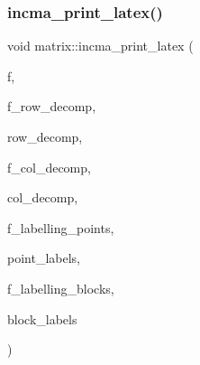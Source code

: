 \mbox{\label{classmatrix_a2f3ef897e502a22def6b90a7c02addf5}} 
\subsubsection{\texorpdfstring{incma\+\_\+print\+\_\+latex()}{incma\_print\_latex()}}
{\footnotesize\ttfamily void matrix\+::incma\+\_\+print\+\_\+latex (\begin{DoxyParamCaption}\item[{ostream \&}]{f,  }\item[{\mbox{\hyperlink{galois_8h_a09fddde158a3a20bd2dcadb609de11dc}{I\+NT}}}]{f\+\_\+row\+\_\+decomp,  }\item[{\mbox{\hyperlink{class_vector}{Vector}} \&}]{row\+\_\+decomp,  }\item[{\mbox{\hyperlink{galois_8h_a09fddde158a3a20bd2dcadb609de11dc}{I\+NT}}}]{f\+\_\+col\+\_\+decomp,  }\item[{\mbox{\hyperlink{class_vector}{Vector}} \&}]{col\+\_\+decomp,  }\item[{\mbox{\hyperlink{galois_8h_a09fddde158a3a20bd2dcadb609de11dc}{I\+NT}}}]{f\+\_\+labelling\+\_\+points,  }\item[{\mbox{\hyperlink{class_vector}{Vector}} \&}]{point\+\_\+labels,  }\item[{\mbox{\hyperlink{galois_8h_a09fddde158a3a20bd2dcadb609de11dc}{I\+NT}}}]{f\+\_\+labelling\+\_\+blocks,  }\item[{\mbox{\hyperlink{class_vector}{Vector}} \&}]{block\+\_\+labels }\end{DoxyParamCaption})}

\mbox{\label{classmatrix_a6e282efff2dd195d9aaf94343768106d}} 

